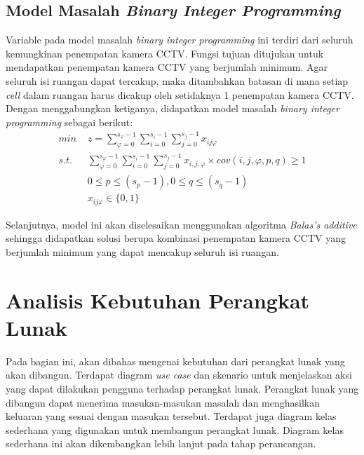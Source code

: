 \subsection{Model Masalah \textit{Binary Integer Programming}}
Variable pada model masalah \textit{binary integer programming} ini terdiri dari seluruh kemungkinan penempatan kamera CCTV. Fungsi tujuan ditujukan untuk mendapatkan penempatan kamera CCTV yang berjumlah minimum. Agar seluruh isi ruangan dapat tercakup, maka ditambahkan batasan di mana setiap \textit{cell} dalam ruangan harus dicakup oleh setidaknya 1 penempatan kamera CCTV. Dengan menggabungkan ketiganya, didapatkan model masalah \textit{binary integer programming} sebagai berikut:
\begin{equation}
	\begin{split}
		\textit{min } & z = \sum_{\varphi=0}^{s_{\varphi}-1} \sum_{i=0}^{s_i-1} \sum_{j=0}^{s_j-1} x_{ij\varphi}\\
		\textit{s.t. } & \sum_{\varphi=0}^{s_{\varphi}-1} \sum_{i=0}^{s_i-1} \sum_{j=0}^{s_j-1} x_{i,j,\varphi} \times cov(i,j,\varphi,p,q) \geq 1\\
		& 0 \leq p \leq (s_p - 1), 0 \leq q \leq (s_q - 1)\\
		& x_{ij\varphi} \in \{0,1\}
	\end{split}
\end{equation}

Selanjutnya, model ini akan diselesaikan menggunakan algoritma \textit{Balas's additive} sehingga didapatkan solusi berupa kombinasi penempatan kamera CCTV yang berjumlah minimum yang dapat mencakup seluruh isi ruangan.

\section{Analisis Kebutuhan Perangkat Lunak}
Pada bagian ini, akan dibahas mengenai kebutuhan dari perangkat lunak yang akan dibangun. Terdapat diagram \textit{use case} dan skenario untuk menjelaskan aksi yang dapat dilakukan pengguna terhadap perangkat lunak. Perangkat lunak yang dibangun dapat menerima masukan-masukan masalah dan menghasilkan keluaran yang sesuai dengan masukan tersebut. Terdapat juga diagram kelas sederhana yang digunakan untuk membangun perangkat lunak. Diagram kelas sederhana ini akan dikembangkan lebih lanjut pada tahap perancangan.

